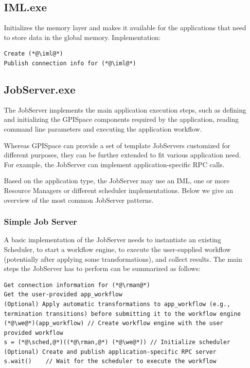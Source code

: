\documentclass[10pt]{article}
\newcommand{\sched}{Scheduler\xspace}
\newcommand{\rman}{RM\xspace}
\begin{document}
\subsection{IML.exe}
Initializes the memory layer and makes it available for the applications that 
need to store data in the global memory.
Implementation:
\begin{lstlisting}
Create (*@\iml@*)
Publish connection info for (*@\iml@*)
\end{lstlisting}

\subsection{JobServer.exe}
The JobServer implements the main application execution steps, such as defining
and initializing the GPISpace components required by the application, reading
command line parameters and executing the application workflow.

Whereas GPISpace can provide a set of template JobServers customized for
different purposes, they can be further extended to fit various application
need. For example, the JobServer can implement application-specific RPC calls.

Based on the application type, the JobServer may use an IML, one or more
Resource Managers or different scheduler implementations. Below we give an
overview of the most common JobServer patterns.

\subsubsection{Simple Job Server}
A basic implementation of the JobServer needs to instantiate an existing
Scheduler, to start a workflow engine, to execute the user-supplied workflow
(potentially after applying some transformations), and collect results.
The main steps the JobServer has to perform can be summarized as follows:
\begin{lstlisting}
Get connection information for (*@\rman@*)
Get the user-provided app_workflow 
(Optional) Apply automatic transformations to app_workflow (e.g., termination transitions) before submitting it to the workflow engine
(*@\we@*)(app_workflow) // Create workflow engine with the user provided workflow
s = (*@\sched,@*)((*@\rman,@*) (*@\we@*)) // Initialize scheduler
(Optional) Create and publish application-specific RPC server
s.wait()    // Wait for the scheduler to execute the workflow
\end{lstlisting}
\end{document}
